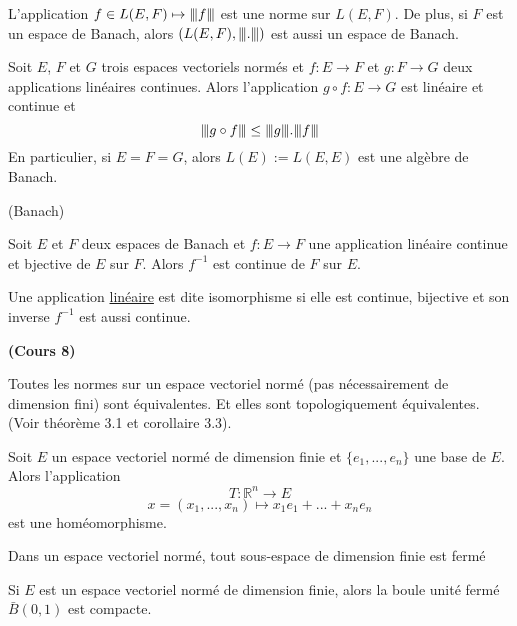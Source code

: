 \documentclass[12pt,a4paper]{article}
\begin{document}
\begin{flushleft}
\begin{thm}
L'application $f \in L(E,F) \mapsto {\left\vert\kern-0.25ex\left\vert\kern-0.25ex\left\vert f \right\vert\kern-0.25ex\right\vert\kern-0.25ex\right\vert}$ est une norme sur $L(E,F)$. De plus, si $F$ est un espace de Banach, alors $(L(E,F), {\left\vert\kern-0.25ex\left\vert\kern-0.25ex\left\vert . \right\vert\kern-0.25ex\right\vert\kern-0.25ex\right\vert})$ est aussi un espace de Banach.
\end{thm}

\begin{thm}
Soit $E$, $F$ et $G$ trois espaces vectoriels normés et $f:E \longrightarrow F$ et $g: F \longrightarrow G$ deux applications linéaires continues. Alors l'application $g \circ f : E \longrightarrow G$ est linéaire et continue et $$ {\left\vert\kern-0.25ex\left\vert\kern-0.25ex\left\vert g \circ f \right\vert\kern-0.25ex\right\vert\kern-0.25ex\right\vert} \leq {\left\vert\kern-0.25ex\left\vert\kern-0.25ex\left\vert g \right\vert\kern-0.25ex\right\vert\kern-0.25ex\right\vert} . {\left\vert\kern-0.25ex\left\vert\kern-0.25ex\left\vert f \right\vert\kern-0.25ex\right\vert\kern-0.25ex\right\vert}$$ En particulier, si $E = F = G$, alors $ L(E):= L(E,E)$ est une algèbre de Banach.
\end{thm}

(Banach)
\begin{thm}
Soit $E$ et $F$ deux espaces de Banach et $f:E \longrightarrow F$ une application linéaire continue et bjective de $E$ sur $F$. Alors $f^{-1}$ est continue de $F$ sur $E$.
\end{thm}

\begin{mydef}
Une application \underline{linéaire} \fef est dite isomorphisme si elle est continue, bijective et son inverse $f^{-1}$ est aussi continue.
\end{mydef} 



\textbf{(Cours 8)}
\begin{cor} Toutes les normes sur un espace vectoriel normé (pas nécessairement de dimension fini) sont équivalentes. Et elles sont topologiquement équivalentes. (Voir théorème 3.1 et corollaire 3.3).
\end{cor}

\begin{thm}
Soit $E$ un espace vectoriel normé de dimension finie et $ \{e_1, ..., e_n \}$ une base de $E$. Alors l'application $$T: \mathbb{R}^n \longrightarrow E$$ $$x = (x_1, ..., x_n) \mapsto x_1 e_1 + ... + x_n e_n$$ est une homéomorphisme.
\end{thm}

\begin{cor} 
Dans un espace vectoriel normé, tout sous-espace de dimension finie est fermé
\end{cor}

\begin{thm}
Si $E$ est un espace vectoriel normé de dimension finie, alors la boule unité fermé $\bar{B} (0,1)$ est compacte.
\end{thm}


\end{flushleft}
\end{document}
